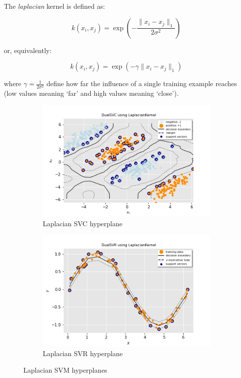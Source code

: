 The \emph{laplacian} kernel is defined as:

\begin{equation} \label{eq:laplacian_kernel1}
	k(x_i,x_j)=\exp(-\frac{\|x_i-x_j\|_1}{2\sigma^2})
\end{equation}

or, equivalently:

\begin{equation} \label{eq:laplacian_kernel2}
	k(x_i,x_j)=\exp(-\gamma \|x_i-x_j\|_1)
\end{equation}

where $\displaystyle \gamma=\frac{1}{2\sigma^2}$ define how far the influence of a single training example reaches (low values meaning ‘far’ and high values meaning ‘close’).

\begin{figure}[h!]
	\centering
	\begin{subfigure}{.49\textwidth}
		\centering
		\includegraphics[width=\textwidth]{img/laplacian_dual_l1_svc_hyperplane}
		\caption{Laplacian SVC hyperplane}
		\label{fig:laplacian_dual_l1_svc_hyperplane}
	\end{subfigure}
	\begin{subfigure}{.49\textwidth}
		\centering
		\captionsetup{justification=centering}
		\includegraphics[width=\textwidth]{img/laplacian_dual_l1_svr_hyperplane}
		\caption{Laplacian SVR hyperplane}
		\label{fig:laplacian_dual_l1_svr_hyperplane}
	\end{subfigure}
\caption{Laplacian SVM hyperplanes}
\end{figure}